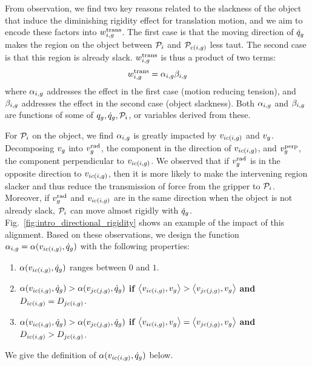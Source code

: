 From observation, we find two key reasons related to the slackness of the object that induce the diminishing rigidity effect for translation motion, and we aim to encode these factors into $w^{\textrm{trans}}_{i, g}$. The first case is that the moving direction of $\dot{q}_g$ makes the region on the object between $\mathcal{P}_i$ and $\mathcal{P}_{c(i, g)}$ less taut. The second case is that this region is already slack. $w^{\textrm{trans}}_{i, g}$ is thus a product of two terms:
\begin{equation}
    w^{\textrm{trans}}_{i, g} = \alpha_{i, g} \beta_{i, g}
    \label{eq:Combined_directional_rigidity}
\end{equation}
where $\alpha_{i, g}$ addresses the effect in the first case (motion reducing tension), and $\beta_{i, g}$ addresses the effect in the second case (object slackness). Both $\alpha_{i, g}$ and $\beta_{i, g}$ are functions of some of $q_g, \dot{q}_g, \mathcal{P}_i$, or variables derived from these.

For $\mathcal{P}_i$ on the object, we find $\alpha_{i, g}$ is greatly impacted by $v_{i c(i, g)}$ and $v_g$. Decomposing $v_g$ into $v_g^{\textrm{rad}}$, the component in the direction of $v_{i c(i, g)}$, and $v_g^{\textrm{perp}}$, the component perpendicular to $v_{i c(i, g)}$. We observed that if $v_g^{\textrm{rad}}$ is in the opposite direction to $v_{i c(i, g)}$, then it is more likely to make the intervening region slacker and thus reduce the transmission of force from the gripper to $\mathcal{P}_i$. Moreover, if $v_g^{\textrm{rad}}$ and $v_{i c(i, g)}$ are in the same direction when the object is not already slack, $\mathcal{P}_i$ can move almost rigidly with $\dot{q}_g$. Fig.~\ref{fig:intro_directional_rigidity} shows an example of the impact of this alignment. Based on these observations, we design the function $\alpha_{i, g} = \alpha(v_{i c(i, g)}, \dot{q}_g)$ with the following properties:
\begin{enumerate}
    \item $\alpha(v_{i c(i, g)}, \dot{q}_g)$ ranges between $0$ and $1$.
    \item $\alpha(v_{i c(i, g)}, \dot{q}_g) > \alpha(v_{j c(j, g)}, \dot{q}_g)$
        \textbf{if} $\left \langle v_{i c(i, g)}, v_g \right \rangle > \left \langle v_{j c(j, g)}, v_g \right \rangle$
        \textbf{and} $D_{i c(i, g)} = D_{j c(i, g)}$.
    \item $\alpha(v_{i c(i, g)}, \dot{q}_g) > \alpha(v_{j c(j, g)}, \dot{q}_g)$
        \textbf{if} $\left \langle v_{i c(i, g)}, v_g \right \rangle = \left \langle v_{j c(j, g)}, v_g \right \rangle$
        \textbf{and} $D_{i c(i, g)} > D_{j c(i, g)}$.
\end{enumerate}
We give the definition of $\alpha(v_{i c(i, g)}, \dot{q}_g)$ below.


